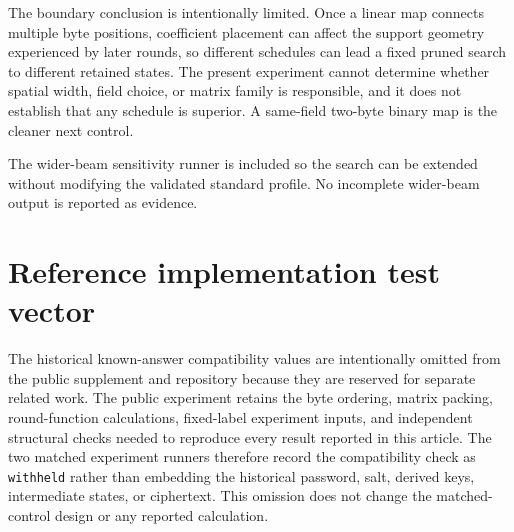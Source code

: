 \documentclass[cryptography,supfile,submit,oneauthor]{Definitions/mdpi}
\begin{document}
The boundary conclusion is intentionally limited. Once a linear map connects multiple byte positions, coefficient placement can affect the support geometry experienced by later rounds, so different schedules can lead a fixed pruned search to different retained states. The present experiment cannot determine whether spatial width, field choice, or matrix family is responsible, and it does not establish that any schedule is superior. A same-field two-byte binary map is the cleaner next control.

The wider-beam sensitivity runner is included so the search can be extended without modifying the validated standard profile. No incomplete wider-beam output is reported as evidence.

\section{Reference implementation test vector}
The historical known-answer compatibility values are intentionally omitted from
the public supplement and repository because they are reserved for separate
related work. The public experiment retains the byte ordering, matrix packing,
round-function calculations, fixed-label experiment inputs, and independent
structural checks needed to reproduce every result reported in this article.
The two matched experiment runners therefore record the compatibility check as
\texttt{withheld} rather than embedding the historical password, salt, derived
keys, intermediate states, or ciphertext. This omission does not change the
matched-control design or any reported calculation.
\end{document}
